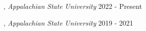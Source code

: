 , \textit{Appalachian State University} \hfill	2022 - Present

, \textit{Appalachian State University}	\hfill 2019 - 2021




